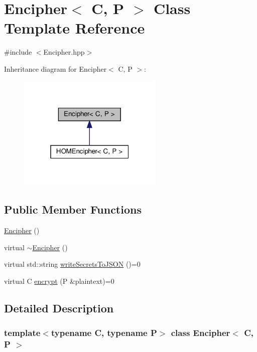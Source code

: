 \hypertarget{classEncipher}{}\section{Encipher$<$ C, P $>$ Class Template Reference}
\label{classEncipher}


{\ttfamily \#include $<$Encipher.\+hpp$>$}



Inheritance diagram for Encipher$<$ C, P $>$\+:\nopagebreak
\begin{figure}[H]
\begin{center}
\leavevmode
\includegraphics[width=196pt]{classEncipher__inherit__graph}
\end{center}
\end{figure}
\subsection*{Public Member Functions}
\begin{DoxyCompactItemize}
\item 
\hyperlink{classEncipher_a0d082b8ecd382929d4592e094c0028a6}{Encipher} ()
\item 
virtual \hyperlink{classEncipher_a0960dbd85f3b203438e16d2027e557fa}{$\sim$\+Encipher} ()
\item 
virtual std\+::string \hyperlink{classEncipher_a27d3efa1e364c1f0d7def65454c61b85}{write\+Secrets\+To\+J\+S\+ON} ()=0
\item 
virtual C \hyperlink{classEncipher_aaf8138eb280608bfd03c6eb762ffc010}{encrypt} (P \&plaintext)=0
\end{DoxyCompactItemize}


\subsection{Detailed Description}
\subsubsection*{template$<$typename C, typename P$>$\newline
class Encipher$<$ C, P $>$}

